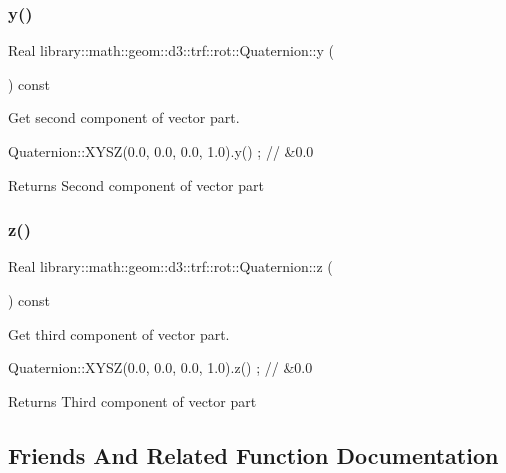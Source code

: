 \subsubsection{\texorpdfstring{y()}{y()}}
{\footnotesize\ttfamily Real library\+::math\+::geom\+::d3\+::trf\+::rot\+::\+Quaternion\+::y (\begin{DoxyParamCaption}{ }\end{DoxyParamCaption}) const}



Get second component of vector part. 


\begin{DoxyCode}
Quaternion::XYSZ(0.0, 0.0, 0.0, 1.0).y() ; \textcolor{comment}{// &0.0}
\end{DoxyCode}


\begin{DoxyReturn}{Returns}
Second component of vector part 
\end{DoxyReturn}
\mbox{\label{classlibrary_1_1math_1_1geom_1_1d3_1_1trf_1_1rot_1_1_quaternion_a855911876f8f59e446740071d0a8194a}} 
\subsubsection{\texorpdfstring{z()}{z()}}
{\footnotesize\ttfamily Real library\+::math\+::geom\+::d3\+::trf\+::rot\+::\+Quaternion\+::z (\begin{DoxyParamCaption}{ }\end{DoxyParamCaption}) const}



Get third component of vector part. 


\begin{DoxyCode}
Quaternion::XYSZ(0.0, 0.0, 0.0, 1.0).z() ; \textcolor{comment}{// &0.0}
\end{DoxyCode}


\begin{DoxyReturn}{Returns}
Third component of vector part 
\end{DoxyReturn}


\subsection{Friends And Related Function Documentation}
\mbox{\label{classlibrary_1_1math_1_1geom_1_1d3_1_1trf_1_1rot_1_1_quaternion_ab9414dc117f260055d0a1a565eb93708}} 
